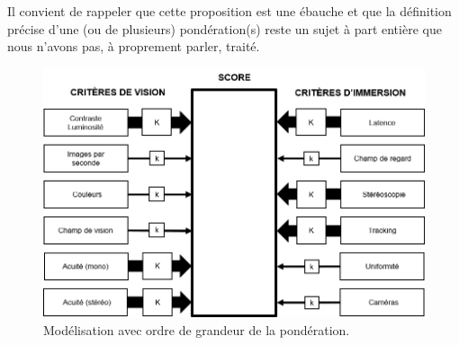 \par Il convient de rappeler que cette proposition est une ébauche et que la définition précise d'une (ou de plusieurs) pondération(s) reste un sujet à part entière que nous n'avons pas, à proprement parler, traité.

\begin{figure}[h]
	\centering
	\includegraphics[scale=1]{Figures/ModeleDefinitifPondere_2}
	\caption{Modélisation avec ordre de grandeur de la pondération.}
	\label{fig:modèle_définitif_pondere}
\end{figure}